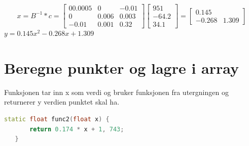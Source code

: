\documentclass[a4paper,norsk]{article}
\begin{document}
\begin{equation*}
x = B^{-1} * c = \begin{bmatrix} 00.0005  & 0 & -0.01\\ 0 & 0.006 & 0.003 \\ -0.01 & 0.001 & 0.32  \end{bmatrix}\begin{bmatrix} 951 \\ -64.2 \\ 34.1\end{bmatrix}
= \begin{bmatrix}0.145  \\ -0.268 & 1.309 \end{bmatrix}
\end{equation*}
$y = 0.145x^{2}-0.268x+1.309$
\section{Beregne punkter og lagre i array}
Funksjonen tar inn x som verdi og bruker funksjonen fra utergningen og returnerer y verdien punktet skal ha.
\begin{lstlisting}[language=C++, caption={trianglesurface.h}]
static float func2(float x) {
       return 0.174 * x + 1, 743;
   }
\end{lstlisting}
\end{document}
